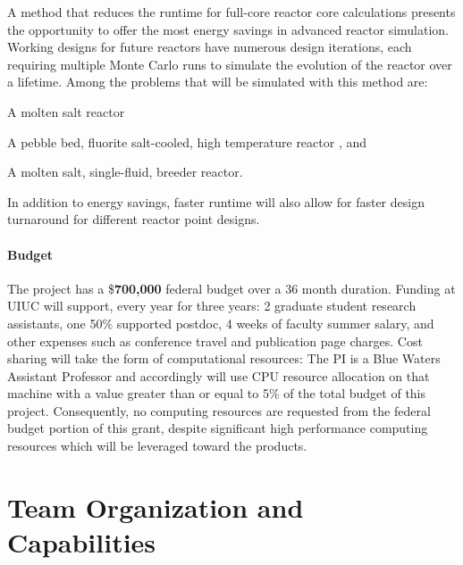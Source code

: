 \documentclass[letterpaper,12pt]{article}
\begin{document}
A method that reduces the runtime for full-core reactor core calculations
presents the opportunity to offer the most energy savings in advanced reactor
simulation. Working designs for future reactors have numerous design iterations,
each requiring multiple Monte Carlo runs to simulate the evolution of the
reactor over a lifetime. Among the problems that will be
simulated with this method are:
\begin{compactitem}
  \item A molten salt reactor \cite{robertson_msre_1965}
  \item A pebble bed, fluorite salt-cooled, high temperature
    reactor \cite{andreades_design_2016}, and
  \item A molten salt, single-fluid, breeder
    reactor\cite{robertson_conceptual_1971}.
\end{compactitem}
In addition to energy savings, faster runtime will also allow for faster design
turnaround for different reactor point designs.
\paragraph{Budget} The project has a \$\textbf{700,000} federal budget over a
36 month duration. Funding at UIUC will support, every year for three years: 2
graduate student research assistants, one 50\% supported postdoc, 4 weeks of
faculty summer salary, and other expenses such as conference travel and
publication page charges. Cost sharing will take the form of computational
resources: The PI is a Blue Waters Assistant Professor and accordingly will
use CPU resource allocation on that machine with a value greater than or equal
to 5\% of the total budget of this project. Consequently, no computing
resources are requested from the federal budget portion of this grant, despite
significant high performance computing resources which will be leveraged toward
the products.


\section{Team Organization and Capabilities}
\end{document}
